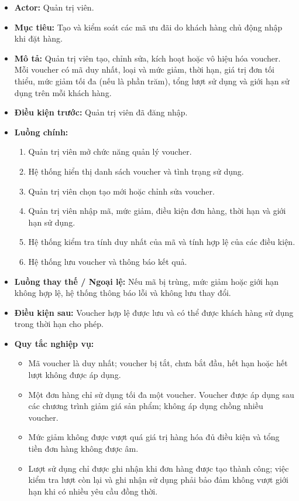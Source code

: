 \documentclass[12pt,a4paper]{article}
\begin{document}
\begin{itemize}
 \item \textbf{Actor:} Quản trị viên.
 \item \textbf{Mục tiêu:} Tạo và kiểm soát các mã ưu đãi do khách hàng chủ động nhập khi đặt hàng.
 \item \textbf{Mô tả:} Quản trị viên tạo, chỉnh sửa, kích hoạt hoặc vô hiệu hóa voucher. Mỗi voucher có mã duy nhất, loại và mức giảm, thời hạn, giá trị đơn tối thiểu, mức giảm tối đa (nếu là phần trăm), tổng lượt sử dụng và giới hạn sử dụng trên mỗi khách hàng.
 \item \textbf{Điều kiện trước:} Quản trị viên đã đăng nhập.
 \item \textbf{Luồng chính:}
 \begin{enumerate}
  \item Quản trị viên mở chức năng quản lý voucher.
  \item Hệ thống hiển thị danh sách voucher và tình trạng sử dụng.
  \item Quản trị viên chọn tạo mới hoặc chỉnh sửa voucher.
  \item Quản trị viên nhập mã, mức giảm, điều kiện đơn hàng, thời hạn và giới hạn sử dụng.
  \item Hệ thống kiểm tra tính duy nhất của mã và tính hợp lệ của các điều kiện.
  \item Hệ thống lưu voucher và thông báo kết quả.
 \end{enumerate}
 \item \textbf{Luồng thay thế / Ngoại lệ:} Nếu mã bị trùng, mức giảm hoặc giới hạn không hợp lệ, hệ thống thông báo lỗi và không lưu thay đổi.
 \item \textbf{Điều kiện sau:} Voucher hợp lệ được lưu và có thể được khách hàng sử dụng trong thời hạn cho phép.
 \item \textbf{Quy tắc nghiệp vụ:}
 \begin{itemize}
  \item Mã voucher là duy nhất; voucher bị tắt, chưa bắt đầu, hết hạn hoặc hết lượt không được áp dụng.
  \item Một đơn hàng chỉ sử dụng tối đa một voucher. Voucher được áp dụng sau các chương trình giảm giá sản phẩm; không áp dụng chồng nhiều voucher.
  \item Mức giảm không được vượt quá giá trị hàng hóa đủ điều kiện và tổng tiền đơn hàng không được âm.
  \item Lượt sử dụng chỉ được ghi nhận khi đơn hàng được tạo thành công; việc kiểm tra lượt còn lại và ghi nhận sử dụng phải bảo đảm không vượt giới hạn khi có nhiều yêu cầu đồng thời.
 \end{itemize}
\end{itemize}
\end{document}
